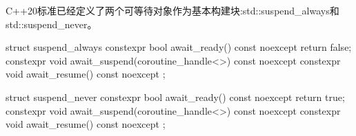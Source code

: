 C++20标准已经定义了两个可等待对象作为基本构建块:std::suspend\_always和std::suspend\_never。


\begin{cpp}
struct suspend_always {
	constexpr bool await_ready() const noexcept { return false; }
	constexpr void await_suspend(coroutine_handle<>) const noexcept {}
	constexpr void await_resume() const noexcept {}
};

struct suspend_never {
	constexpr bool await_ready() const noexcept { return true; }
	constexpr void await_suspend(coroutine_handle<>) const noexcept {}
	constexpr void await_resume() const noexcept {}
};
\end{cpp}












